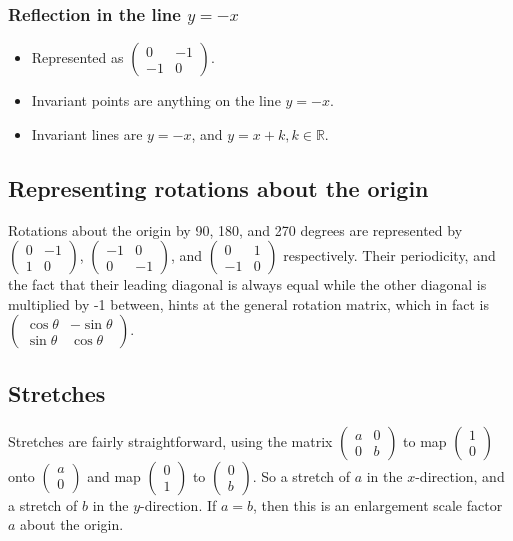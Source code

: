 \subsubsection{Reflection in the line $y=-x$}
\begin{itemize}
	\item Represented as $\begin{pmatrix}0 & -1 \\ -1 & 0\end{pmatrix}$.
	\item Invariant points are anything on the line $y=-x$.
	\item Invariant lines are $y=-x$, and $y=x+k,k \in \mathbb{R}$.
\end{itemize}

\subsection{Representing rotations about the origin}
Rotations about the origin by 90, 180, and 270 degrees are represented by $\begin{pmatrix}0 & -1 \\ 1 & 0\end{pmatrix}$, $\begin{pmatrix}-1 & 0 \\ 0 & -1\end{pmatrix}$, and $\begin{pmatrix}0 & 1 \\ -1 & 0\end{pmatrix}$ respectively. Their periodicity, and the fact that their leading diagonal is always equal while the other diagonal is multiplied by -1 between, hints at the general rotation matrix, which in fact is $\begin{pmatrix}\cos \theta & -\sin \theta \\ \sin \theta & \cos \theta \end{pmatrix}$.

\subsection{Stretches}
Stretches are fairly straightforward, using the matrix $\begin{pmatrix}a & 0 \\ 0 & b \end{pmatrix}$ to map $\begin{pmatrix}1 \\ 0\end{pmatrix}$ onto $\begin{pmatrix}a \\ 0\end{pmatrix}$ and map $\begin{pmatrix}0 \\ 1\end{pmatrix}$ to $\begin{pmatrix}0 \\ b\end{pmatrix}$. So a stretch of $a$ in the $x$-direction, and a stretch of $b$ in the $y$-direction. If $a=b$, then this is an enlargement scale factor $a$ about the origin.


